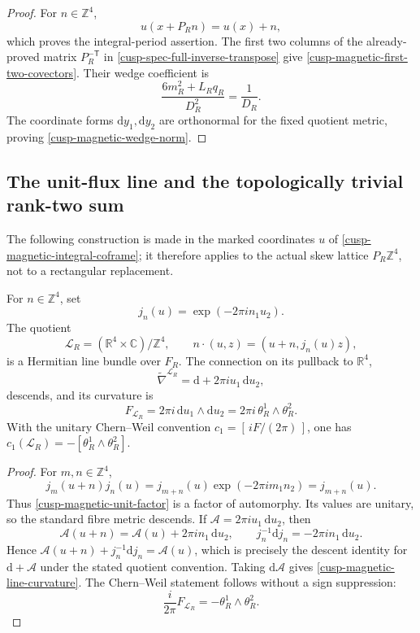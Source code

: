 \begin{proof}
For \(n\in\mathbb Z^4\),
\[
 u(x+P_Rn)=u(x)+n,
\]
which proves the integral-period assertion.  The first two columns of the
already-proved matrix \(P_R^{-\mathsf T}\) in
\cref{cusp-spec-full-inverse-transpose} give
\cref{cusp-magnetic-first-two-covectors}.  Their wedge coefficient is
\[
 \frac{6m_R^2+L_Rq_R}{D_R^2}=\frac1{D_R}.
\]
The coordinate forms \(\mathrm dy_1,\mathrm dy_2\) are orthonormal for the fixed quotient
metric, proving \cref{cusp-magnetic-wedge-norm}.
\end{proof}

\subsection{The unit-flux line and the topologically trivial rank-two sum}

The following construction is made in the marked coordinates \(u\) of
\eqref{cusp-magnetic-integral-coframe}; it therefore applies to the actual
skew lattice \(P_R\mathbb Z^4\), not to a rectangular replacement.

\begin{proposition}
\label{cusp-magnetic-line-bundle-proposition}
For \(n\in\mathbb Z^4\), set
\begin{equation}
 j_n(u)=\exp(-2\pi i n_1u_2).
 \label{cusp-magnetic-unit-factor}
\end{equation}
The quotient
\[
 \mathscr L_R=(\mathbb R^4\times\mathbb C)/\mathbb Z^4,
 \qquad
 n\cdot(u,z)=(u+n,j_n(u)z),
\]
is a Hermitian line bundle over \(F_R\).  The connection on its pullback
to \(\mathbb R^4\),
\begin{equation}
 \widetilde\nabla^{\mathscr L_R}
 =\mathrm d+2\pi i u_1\,\mathrm du_2,
 \label{cusp-magnetic-line-connection}
\end{equation}
descends, and its curvature is
\begin{equation}
 F_{\mathscr L_R}=2\pi i\,\mathrm du_1\wedge\mathrm du_2
        =2\pi i\,\theta_R^1\wedge\theta_R^2.
 \label{cusp-magnetic-line-curvature}
\end{equation}
With the unitary Chern--Weil convention
\(c_1=[\,iF/(2\pi)\,]\), one has
\(c_1(\mathscr L_R)=-[\theta_R^1\wedge\theta_R^2]\).
\end{proposition}

\begin{proof}
For \(m,n\in\mathbb Z^4\),
\[
 j_m(u+n)j_n(u)
 =j_{m+n}(u)\exp(-2\pi i m_1n_2)
 =j_{m+n}(u).
\]
Thus \eqref{cusp-magnetic-unit-factor} is a factor of automorphy.  Its
values are unitary, so the standard fibre metric descends.  If
\(\mathcal A=2\pi i u_1\,\mathrm du_2\), then
\[
 \mathcal A(u+n)=\mathcal A(u)+2\pi i n_1\,\mathrm du_2,
 \qquad
 j_n^{-1}\mathrm dj_n=-2\pi i n_1\,\mathrm du_2.
\]
Hence \(\mathcal A(u+n)+j_n^{-1}\mathrm dj_n=\mathcal A(u)\), which is precisely
the descent identity for \(\mathrm d+\mathcal A\) under the stated quotient
convention.  Taking \(\mathrm d\mathcal A\) gives
\eqref{cusp-magnetic-line-curvature}.  The Chern--Weil statement follows
without a sign suppression:
\[
 \frac{i}{2\pi}F_{\mathscr L_R}=-\theta_R^1\wedge\theta_R^2.
\]
\end{proof}

